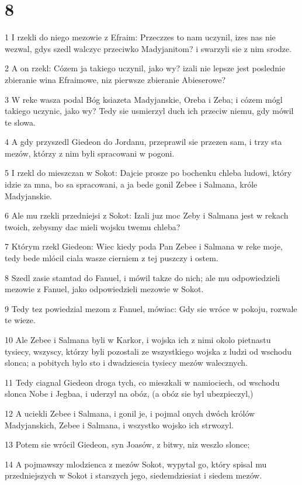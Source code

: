 \chapter{8}

\par 1 I rzekli do niego mezowie z Efraim: Przeczzes to nam uczynil, izes nas nie wezwal, gdys szedl walczyc przeciwko Madyjanitom? i swarzyli sie z nim srodze.
\par 2 A on rzekl: Cózem ja takiego uczynil, jako wy? izali nie lepsze jest poslednie zbieranie wina Efraimowe, niz pierwsze zbieranie Abieserowe?
\par 3 W reke wasza podal Bóg ksiazeta Madyjanskie, Oreba i Zeba; i cózem mógl takiego uczynic, jako wy? Tedy sie usmierzyl duch ich przeciw niemu, gdy mówil te slowa.
\par 4 A gdy przyszedl Giedeon do Jordanu, przeprawil sie przezen sam, i trzy sta mezów, którzy z nim byli spracowani w pogoni.
\par 5 I rzekl do mieszczan w Sokot: Dajcie prosze po bochenku chleba ludowi, który idzie za mna, bo sa spracowani, a ja bede gonil Zebee i Salmana, króle Madyjanskie.
\par 6 Ale mu rzekli przedniejsi z Sokot: Izali juz moc Zeby i Salmana jest w rekach twoich, zebysmy dac mieli wojsku twemu chleba?
\par 7 Którym rzekl Giedeon: Wiec kiedy poda Pan Zebee i Salmana w reke moje, tedy bede mlócil ciala wasze cierniem z tej puszczy i ostem.
\par 8 Szedl zasie stamtad do Fanuel, i mówil takze do nich; ale mu odpowiedzieli mezowie z Fanuel, jako odpowiedzieli mezowie w Sokot.
\par 9 Tedy tez powiedzial mezom z Fanuel, mówiac: Gdy sie wróce w pokoju, rozwale te wieze.
\par 10 Ale Zebee i Salmana byli w Karkor, i wojska ich z nimi okolo pietnastu tysiecy, wszyscy, którzy byli pozostali ze wszystkiego wojska z ludzi od wschodu slonca; a pobitych bylo sto i dwadziescia tysiecy mezów walecznych.
\par 11 Tedy ciagnal Giedeon droga tych, co mieszkali w namiociech, od wschodu slonca Nobe i Jegbaa, i uderzyl na obóz, (a obóz sie byl ubezpieczyl,)
\par 12 A uciekli Zebee i Salmana, i gonil je, i pojmal onych dwóch królów Madyjanskich, Zebee i Salmana, i wszystko wojsko ich strwozyl.
\par 13 Potem sie wrócil Giedeon, syn Joasów, z bitwy, niz weszlo slonce;
\par 14 A pojmawszy mlodzienca z mezów Sokot, wypytal go, który spisal mu przedniejszych w Sokot i starszych jego, siedemdziesiat i siedem mezów.
